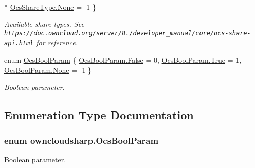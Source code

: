 \begin{DoxyCompactItemize}
\\*
\hyperlink{namespaceowncloudsharp_a51141c9a2e84eaced736ab96ea4b2f0ba6adf97f83acf6453d4a6a4b1070f3754}{Ocs\+Share\+Type.\+None} = -\/1
 \}\begin{DoxyCompactList}\small\item\em Available share types. See {\ttfamily \href{https://doc.owncloud.org/server/8.2/developer_manual/core/ocs-share-api.html}{\tt https\+://doc.\+owncloud.\+org/server/8./developer\+\_\+manual/core/ocs-\/share-\/api.\+html}} for reference. \end{DoxyCompactList}
\item 
enum \hyperlink{namespaceowncloudsharp_a7d494b18f174086318df1bdf916068b5}{Ocs\+Bool\+Param} \{ \hyperlink{namespaceowncloudsharp_a7d494b18f174086318df1bdf916068b5af8320b26d30ab433c5a54546d21f414c}{Ocs\+Bool\+Param.\+False} = 0, 
\hyperlink{namespaceowncloudsharp_a7d494b18f174086318df1bdf916068b5af827cf462f62848df37c5e1e94a4da74}{Ocs\+Bool\+Param.\+True} = 1, 
\hyperlink{namespaceowncloudsharp_a7d494b18f174086318df1bdf916068b5a6adf97f83acf6453d4a6a4b1070f3754}{Ocs\+Bool\+Param.\+None} = -\/1
 \}\begin{DoxyCompactList}\small\item\em Boolean parameter. \end{DoxyCompactList}
\end{DoxyCompactItemize}


\subsection{Enumeration Type Documentation}
\hypertarget{namespaceowncloudsharp_a7d494b18f174086318df1bdf916068b5}{}
\subsubsection[{Ocs\+Bool\+Param}]{\setlength{\rightskip}{0pt plus 5cm}enum {\bf owncloudsharp.\+Ocs\+Bool\+Param}\hspace{0.3cm}{\ttfamily [strong]}}\label{namespaceowncloudsharp_a7d494b18f174086318df1bdf916068b5}


Boolean parameter. 

